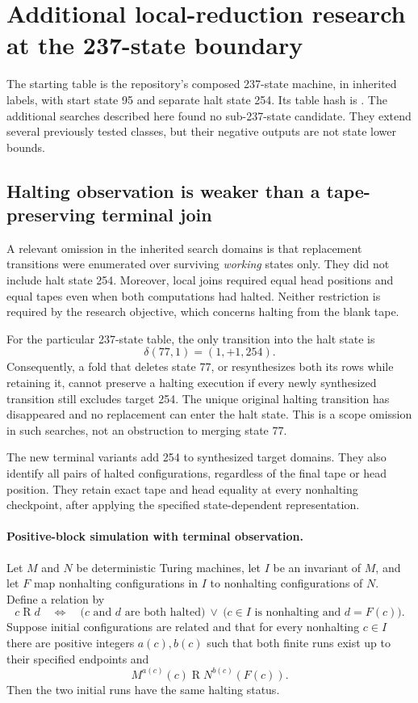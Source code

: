 \section{Additional local-reduction research at the 237-state boundary}

The starting table is the repository's composed 237-state machine, in inherited
labels, with start state 95 and separate halt state 254. Its table hash is
.
The additional searches described here found no sub-237-state candidate.
They extend several previously tested classes, but their negative outputs are
not state lower bounds.

\subsection{Halting observation is weaker than a tape-preserving terminal join}

A relevant omission in the inherited search domains is that replacement
transitions were enumerated over surviving \emph{working} states only. They did
not include halt state 254. Moreover, local joins required equal head positions
and equal tapes even when both computations had halted. Neither restriction is
required by the research objective, which concerns halting from the blank tape.

For the particular 237-state table, the only transition into the halt state is
\[
 \delta(77,1)=(1,+1,254).
\]
Consequently, a fold that deletes state 77, or resynthesizes both its rows while
retaining it, cannot preserve a halting execution if every newly synthesized
transition still excludes target 254. The unique original halting transition
has disappeared and no replacement can enter the halt state. This is a scope
omission in such searches, not an obstruction to merging state 77.

The new terminal variants add 254 to synthesized target domains. They also
identify all pairs of halted configurations, regardless of the final tape or
head position. They retain exact tape and head equality at every nonhalting
checkpoint, after applying the specified state-dependent representation.

\paragraph{Positive-block simulation with terminal observation.}
Let $M$ and $N$ be deterministic Turing machines, let $I$ be an invariant of $M$,
and let $F$ map nonhalting configurations in $I$ to nonhalting configurations of
$N$. Define a relation by
\[
 c\mathrel{R}d\quad\Longleftrightarrow\quad
 \bigl(c\text{ and }d\text{ are both halted}\bigr)
 \ \lor\ 
 \bigl(c\in I\text{ is nonhalting and }d=F(c)\bigr).
\]
Suppose initial configurations are related and that for every nonhalting
$c\in I$ there are positive integers $a(c),b(c)$ such that both finite runs
exist up to their specified endpoints and
\[
 M^{a(c)}(c)\mathrel{R}N^{b(c)}(F(c)).
\]
Then the two initial runs have the same halting status.

